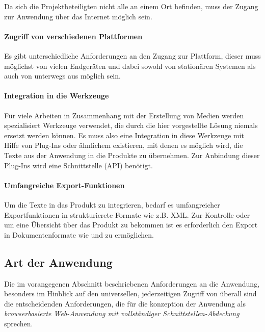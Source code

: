 Da sich die Projektbeteiligten nicht alle an einem Ort befinden, muss der Zugang zur Anwendung über das Internet möglich sein.

\paragraph{Zugriff von verschiedenen Plattformen}

Es gibt unterschiedliche Anforderungen an den Zugang zur Plattform, dieser muss möglichst von vielen Endgeräten und dabei sowohl von stationären Systemen als auch von unterwegs aus möglich sein.

\paragraph{Integration in die Werkzeuge}

Für viele Arbeiten in Zusammenhang mit der Erstellung von Medien werden spezialisiert Werkzeuge verwendet, die durch die hier vorgestellte Lösung niemals ersetzt werden können. Es muss also eine Integration in diese Werkzeuge mit Hilfe von Plug-Ins oder ähnlichem existieren, mit denen es möglich wird, die Texte aus der Anwendung in die Produkte zu übernehmen. Zur Anbindung dieser Plug-Ins wird eine Schnittstelle (API) benötigt.

\paragraph{Umfangreiche Export-Funktionen}

Um die Texte in das Produkt zu integrieren, bedarf es umfangreicher Exportfunktionen in strukturierete Formate wie z.B. XML. Zur Kontrolle oder um eine Übersicht über das Produkt zu bekommen ist es erforderlich den Export in Dokumentenformate wie  und  zu ermöglichen.

\subsection{Art der Anwendung}\label{l:loesungsart}

Die im vorangegenen Abschnitt beschriebenen Anforderungen an die Anwendung, besonders im Hinblick auf den universellen, jederzeitigen Zugriff von überall sind die entscheidenden Anforderungen, die für die konzeption der Anwendung als \emph{browserbasierte Web-Anwendung mit vollständiger Schnittstellen-Abdeckung} sprechen. 

\bigskip

